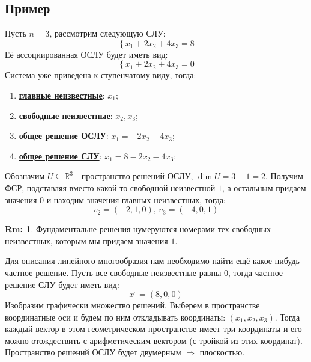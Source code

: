 \documentclass[12pt]{article}
\newcommand{\MR}{\mathbb{R}}
\theoremstyle{definition}
\newtheorem{rem}{Rm:}
\begin{document}
\subsection*{Пример}
Пусть $n = 3$, рассмотрим следующую СЛУ:
$$
	\left\{
		x_1 +2x_2 + 4x_3 = 8
	\right.
$$
Её ассоциированная ОСЛУ будет иметь вид:
$$
	\left\{
		x_1 +2x_2 + 4x_3 = 0
	\right.
$$
Система уже приведена к ступенчатому виду, тогда:
\begin{enumerate}[label=\arabic*)]
	\item \textbf{\uline{главные неизвестные}}: $x_1$;
	\item \textbf{\uline{свободные неизвестные}}: $x_2,x_3$;
	\item \textbf{\uline{общее решение ОСЛУ}}: $x_1 = - 2x_2 - 4x_3$;
	\item \textbf{\uline{общее решение СЛУ}}: $x_1 = 8 - 2x_2 - 4x_3$;
\end{enumerate}
Обозначим $U \subseteq \MR^3$ - пространство решений ОСЛУ, $\dim{U} = 3- 1 = 2$. Получим ФСР, подставляя вместо какой-то свободной неизвестной $1$, а остальным придаем значения $0$ и находим значения главных неизвестных, тогда: 
$$
	v_2 = (-2,1,0), \, v_3 =  (-4,0,1)
$$
\begin{rem}
	Фундаментальне решения нумеруются номерами тех свободных неизвестных, которым мы придаем значения $1$.
\end{rem}
Для описания линейного многообразия нам необходимо найти ещё какое-нибудь частное решение. Пусть все свободные неизвестные равны $0$, тогда частное решение СЛУ будет иметь вид:
$$
	x^{\circ} = (8,0,0)
$$
Изобразим графически множество решений. Выберем в пространстве координатные оси и будем по ним откладывать координаты: $(x_1, x_2, x_3)$. Тогда каждый вектор в этом геометрическом пространстве имеет три координаты и его можно отождествить с арифметическим вектором (с тройкой из этих координат). Пространство решений ОСЛУ будет двумерным $\Rightarrow$ плоскостью.
\end{document}

